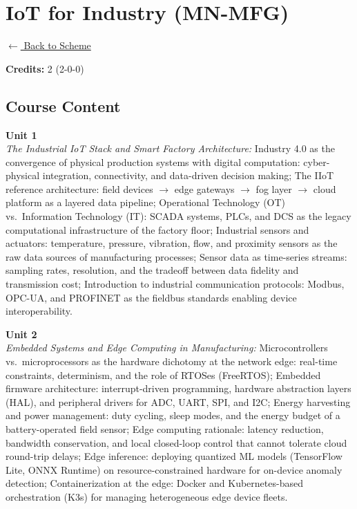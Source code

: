 \section*{IoT for Industry (MN-MFG)}
\label{minor:MFG_L1}

\noindent \small{\hyperref[main:scheme]{$\leftarrow$ Back to Scheme}} \vspace{0.5cm}

\noindent \textbf{Credits:} 2 (2-0-0)

\subsection*{Course Content}
\noindent\textbf{Unit 1} \\
\textit{The Industrial IoT Stack and Smart Factory Architecture:} Industry 4.0 as the convergence of physical production systems with digital computation: cyber-physical integration, connectivity, and data-driven decision making; The IIoT reference architecture: field devices $\rightarrow$ edge gateways $\rightarrow$ fog layer $\rightarrow$ cloud platform as a layered data pipeline; Operational Technology (OT) vs.\ Information Technology (IT): SCADA systems, PLCs, and DCS as the legacy computational infrastructure of the factory floor; Industrial sensors and actuators: temperature, pressure, vibration, flow, and proximity sensors as the raw data sources of manufacturing processes; Sensor data as time-series streams: sampling rates, resolution, and the tradeoff between data fidelity and transmission cost; Introduction to industrial communication protocols: Modbus, OPC-UA, and PROFINET as the fieldbus standards enabling device interoperability.

\vspace{0.3cm}

\noindent\textbf{Unit 2} \\
\textit{Embedded Systems and Edge Computing in Manufacturing:} Microcontrollers vs.\ microprocessors as the hardware dichotomy at the network edge: real-time constraints, determinism, and the role of RTOSes (FreeRTOS); Embedded firmware architecture: interrupt-driven programming, hardware abstraction layers (HAL), and peripheral drivers for ADC, UART, SPI, and I2C; Energy harvesting and power management: duty cycling, sleep modes, and the energy budget of a battery-operated field sensor; Edge computing rationale: latency reduction, bandwidth conservation, and local closed-loop control that cannot tolerate cloud round-trip delays; Edge inference: deploying quantized ML models (TensorFlow Lite, ONNX Runtime) on resource-constrained hardware for on-device anomaly detection; Containerization at the edge: Docker and Kubernetes-based orchestration (K3s) for managing heterogeneous edge device fleets.

